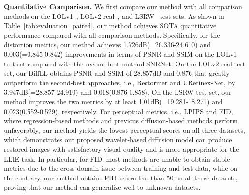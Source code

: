 \textbf{Quantitative Comparison.} We first compare our method with all comparison methods on the LOLv1~\cite{RetinexNet}, LOLv2-real~\cite{LOLV2}, and LSRW~\cite{R2RNet} test sets. As shown in Table~\ref{tab:evaluation_paired}, our method achieves SOTA quantitative performance compared with all comparison methods. Specifically, for the distortion metrics, our method achieves 1.726dB(=26.336-24.610) and 0.003(=0.845-0.842) improvements in terms of PSNR and SSIM on the LOLv1 test set compared with the second-best method SNRNet. On the LOLv2-real test set, our DiffLL obtains PSNR and SSIM of 28.857dB and 0.876 that greatly outperform the second-best approaches, i.e., Restormer and URetinex-Net, by 3.947dB(=28.857-24.910) and 0.018(0.876-0.858). On the LSRW test set, our method improves the two metrics by at least 1.01dB(=19.281-18.271) and 0.023(0.552-0.529), respectively. For perceptual metrics, i.e., LPIPS and FID, where regression-based methods and previous diffusion-based methods perform unfavorably, our method yields the lowest perceptual scores on all three datasets, which demonstrates our proposed wavelet-based diffusion model can produce restored images with satisfactory visual quality and is more appropriate for the LLIE task. In particular, for FID, most methods are unable to obtain stable metrics due to the cross-domain issue between training and test data, while on the contrary, our method obtains FID scores less than 50 on all three datasets, proving that our method can generalize well to unknown datasets.
